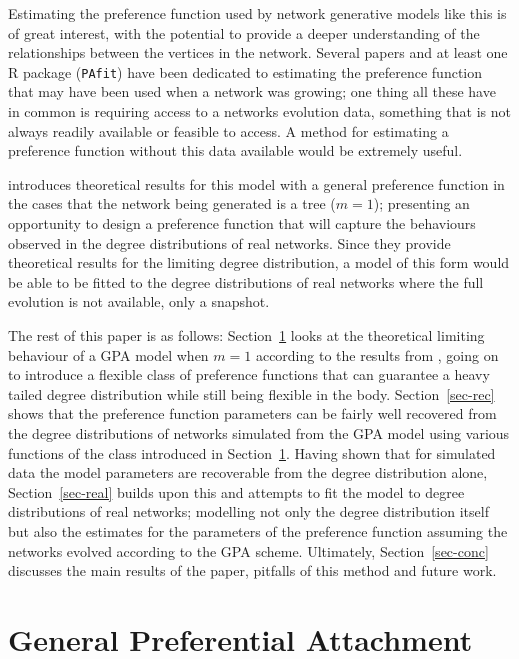 \documentclass[
  sn-basic,
]{sn-jnl}
\theoremstyle{plain}
\theoremstyle{remark}
\begin{document}
Estimating the preference function used by network generative models
like this is of great interest, with the potential to provide a deeper
understanding of the relationships between the vertices in the network.
Several papers and at least one R package (\texttt{PAfit}) have been
dedicated to estimating the preference function that may have been used
when a network was growing; one thing all these have in common is
requiring access to a networks evolution data, something that is not
always readily available or feasible to access. A method for estimating
a preference function without this data available would be extremely
useful.

\citep{rudas07} introduces theoretical results for this model with a
general preference function in the cases that the network being
generated is a tree (\(m=1\)); presenting an opportunity to design a
preference function that will capture the behaviours observed in the
degree distributions of real networks. Since they provide theoretical
results for the limiting degree distribution, a model of this form would
be able to be fitted to the degree distributions of real networks where
the full evolution is not available, only a snapshot.

The rest of this paper is as follows: Section~\ref{sec-gpa} looks at the
theoretical limiting behaviour of a GPA model when \(m=1\) according to
the results from \citep{rudas07}, going on to introduce a flexible class
of preference functions that can guarantee a heavy tailed degree
distribution while still being flexible in the body.
Section~\ref{sec-rec} shows that the preference function parameters can
be fairly well recovered from the degree distributions of networks
simulated from the GPA model using various functions of the class
introduced in Section~\ref{sec-gpa}. Having shown that for simulated
data the model parameters are recoverable from the degree distribution
alone, Section~\ref{sec-real} builds upon this and attempts to fit the
model to degree distributions of real networks; modelling not only the
degree distribution itself but also the estimates for the parameters of
the preference function assuming the networks evolved according to the
GPA scheme. Ultimately, Section~\ref{sec-conc} discusses the main
results of the paper, pitfalls of this method and future work.

\section{General Preferential Attachment}\label{sec-gpa}
\end{document}
